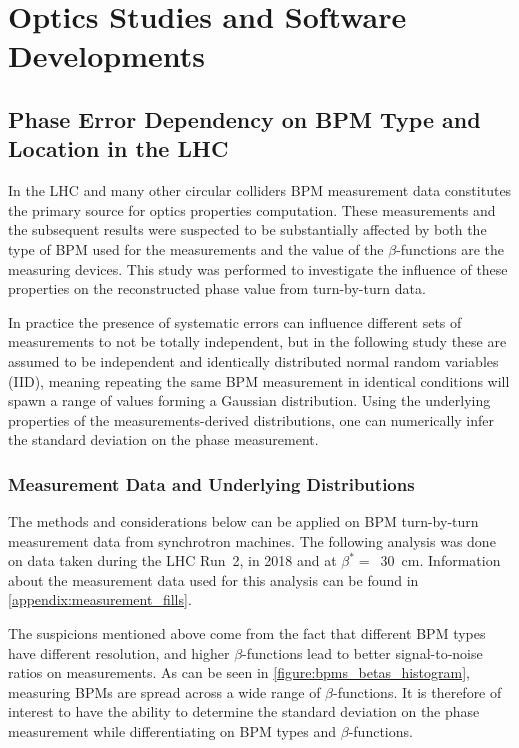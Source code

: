 \chapter{Optics Studies and Software Developments}
\label{chapter:Others_and_Software}


\section{Phase Error Dependency on BPM Type and Location in the LHC}

In the LHC and many other circular colliders BPM measurement data constitutes the primary source for optics properties computation.
These measurements and the subsequent results were suspected to be substantially affected by both the type of BPM used for the measurements and the value of the \(\beta\)-functions are the measuring devices.
This study was performed to investigate the influence of these properties on the reconstructed phase value from turn-by-turn data.

In practice the presence of systematic errors can influence different sets of measurements to not be totally independent, but in the following study these are assumed to be independent and identically distributed normal random variables (IID), meaning repeating the same BPM measurement in identical conditions will spawn a range of values forming a Gaussian distribution.
Using the underlying properties of the measurements-derived distributions, one can numerically infer the standard deviation on the phase measurement. 

\subsection{Measurement Data and Underlying Distributions}

The methods and considerations below can be applied on BPM turn-by-turn measurement data from synchrotron machines.
The following analysis was done on data taken during the LHC Run~\num{2}, in \num{2018} and at \(\beta^{\ast} =\)~\qty{30}{\centi\meter}.
Information about the measurement data used for this analysis can be found in \cref{appendix:measurement_fills}.

The suspicions mentioned above come from the fact that different BPM types have different resolution, and higher \(\beta\)-functions lead to better signal-to-noise ratios on measurements.
As can be seen in \cref{figure:bpms_betas_histogram}, measuring BPMs are spread across a wide range of \(\beta\)-functions.
It is therefore of interest to have the ability to determine the standard deviation on the phase measurement while differentiating on BPM types and \(\beta\)-functions.

